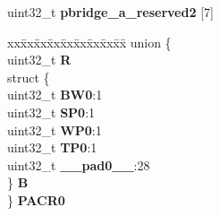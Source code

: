 \begin{DoxyCompactItemize}
\begin{tabbing}
\end{tabbing}\item 
\mbox{\label{structPBRIDGE__A__tag_a2053d3af6a6742f8903d332debc3c6ed}} 
uint32\+\_\+t {\bfseries pbridge\+\_\+a\+\_\+reserved2} \mbox{[}7\mbox{]}
\item 
\mbox{\label{structPBRIDGE__A__tag_a8dbf61e3cf8426a99d5a23af1a908a58}} 
\begin{tabbing}
xx\=xx\=xx\=xx\=xx\=xx\=xx\=xx\=xx\=\kill
union \{\\
\>uint32\_t {\bfseries R}\\
\>struct \{\\
\>\>uint32\_t {\bfseries BW0}:1\\
\>\>uint32\_t {\bfseries SP0}:1\\
\>\>uint32\_t {\bfseries WP0}:1\\
\>\>uint32\_t {\bfseries TP0}:1\\
\>\>uint32\_t {\bfseries \_\_pad0\_\_}:28\\
\>\} {\bfseries B}\\
\} {\bfseries PACR0}\\


\end{tabbing}
\end{DoxyCompactItemize}
